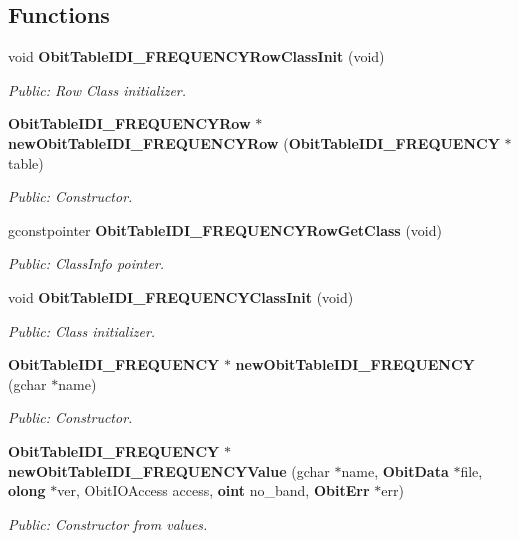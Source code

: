 \subsection*{Functions}
\begin{CompactItemize}
\item 
void {\bf Obit\-Table\-IDI\_\-FREQUENCYRow\-Class\-Init} (void)
\begin{CompactList}\small\item\em Public: Row Class initializer. \item\end{CompactList}\item 
{\bf Obit\-Table\-IDI\_\-FREQUENCYRow} $\ast$ {\bf new\-Obit\-Table\-IDI\_\-FREQUENCYRow} ({\bf Obit\-Table\-IDI\_\-FREQUENCY} $\ast$table)
\begin{CompactList}\small\item\em Public: Constructor. \item\end{CompactList}\item 
gconstpointer {\bf Obit\-Table\-IDI\_\-FREQUENCYRow\-Get\-Class} (void)
\begin{CompactList}\small\item\em Public: Class\-Info pointer. \item\end{CompactList}\item 
void {\bf Obit\-Table\-IDI\_\-FREQUENCYClass\-Init} (void)
\begin{CompactList}\small\item\em Public: Class initializer. \item\end{CompactList}\item 
{\bf Obit\-Table\-IDI\_\-FREQUENCY} $\ast$ {\bf new\-Obit\-Table\-IDI\_\-FREQUENCY} (gchar $\ast$name)
\begin{CompactList}\small\item\em Public: Constructor. \item\end{CompactList}\item 
{\bf Obit\-Table\-IDI\_\-FREQUENCY} $\ast$ {\bf new\-Obit\-Table\-IDI\_\-FREQUENCYValue} (gchar $\ast$name, {\bf Obit\-Data} $\ast$file, {\bf olong} $\ast$ver, Obit\-IOAccess access, {\bf oint} no\_\-band, {\bf Obit\-Err} $\ast$err)
\begin{CompactList}\small\item\em Public: Constructor from values. \item\end{CompactList}\item 

\end{CompactItemize}
